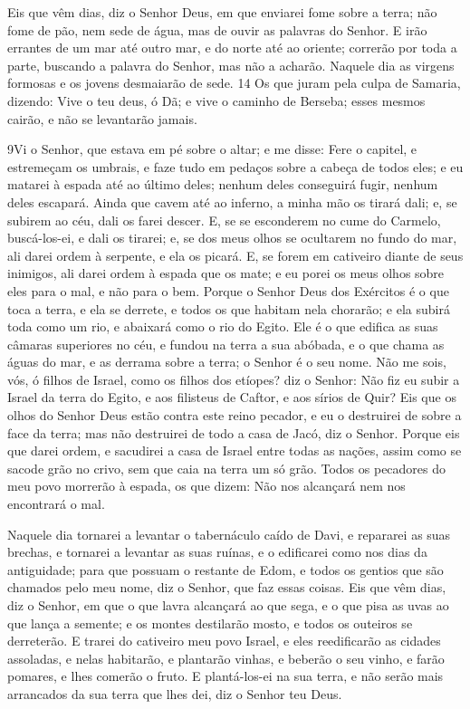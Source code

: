 Eis que vêm dias, diz o Senhor Deus, em que enviarei fome sobre a
terra; não fome de pão, nem sede de água, mas de ouvir as palavras
do Senhor. E irão errantes de um mar até outro mar, e do
norte até ao oriente; correrão por toda a parte, buscando a palavra
do Senhor, mas não a acharão. Naquele dia as virgens formosas
e os jovens desmaiarão de sede. 14 Os que juram pela culpa de
Samaria, dizendo: Vive o teu deus, ó Dã; e vive o caminho de
Berseba; esses mesmos cairão, e não se levantarão jamais.

\medskip

\lettrine{9} Vi o Senhor, que estava em pé sobre o altar; e me
disse: Fere o capitel, e estremeçam os umbrais, e faze tudo em
pedaços sobre a cabeça de todos eles; e eu matarei à espada até ao
último deles; nenhum deles conseguirá fugir, nenhum deles escapará.
Ainda que cavem até ao inferno, a minha mão os tirará dali; e,
se subirem ao céu, dali os farei descer. E, se se esconderem no
cume do Carmelo, buscá-los-ei, e dali os tirarei; e, se dos meus
olhos se ocultarem no fundo do mar, ali darei ordem à serpente, e
ela os picará. E, se forem em cativeiro diante de seus inimigos,
ali darei ordem à espada que os mate; e eu porei os meus olhos sobre
eles para o mal, e não para o bem. Porque o Senhor Deus dos
Exércitos é o que toca a terra, e ela se derrete, e todos os que
habitam nela chorarão; e ela subirá toda como um rio, e abaixará
como o rio do Egito. Ele é o que edifica as suas câmaras
superiores no céu, e fundou na terra a sua abóbada, e o que chama as
águas do mar, e as derrama sobre a terra; o Senhor é o seu nome.
Não me sois, vós, ó filhos de Israel, como os filhos dos
etíopes? diz o Senhor: Não fiz eu subir a Israel da terra do Egito,
e aos filisteus de Caftor, e aos sírios de Quir? Eis que os
olhos do Senhor Deus estão contra este reino pecador, e eu o
destruirei de sobre a face da terra; mas não destruirei de todo a
casa de Jacó, diz o Senhor. Porque eis que darei ordem, e
sacudirei a casa de Israel entre todas as nações, assim como se
sacode grão no crivo, sem que caia na terra um só grão. Todos
os pecadores do meu povo morrerão à espada, os que dizem: Não nos
alcançará nem nos encontrará o mal.

Naquele dia tornarei a levantar o tabernáculo caído de Davi, e
repararei as suas brechas, e tornarei a levantar as suas ruínas, e o
edificarei como nos dias da antiguidade; para que possuam o
restante de Edom, e todos os gentios que são chamados pelo meu nome,
diz o Senhor, que faz essas coisas. Eis que vêm dias, diz o
Senhor, em que o que lavra alcançará ao que sega, e o que pisa as
uvas ao que lança a semente; e os montes destilarão mosto, e todos
os outeiros se derreterão. E trarei do cativeiro meu povo
Israel, e eles reedificarão as cidades assoladas, e nelas habitarão,
e plantarão vinhas, e beberão o seu vinho, e farão pomares, e lhes
comerão o fruto. E plantá-los-ei na sua terra, e não serão
mais arrancados da sua terra que lhes dei, diz o Senhor teu Deus.


